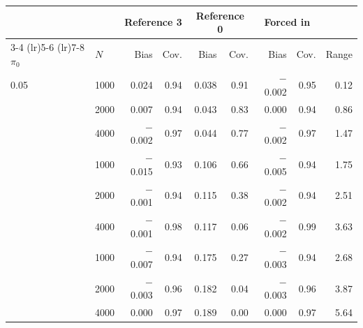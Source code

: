\begin{tabular}{ll rr rr rr r}
\toprule
 & & \multicolumn{2}{c}{Reference 3} & \multicolumn{2}{c}{Reference 0} & \multicolumn{2}{c}{Forced in} & \\
\cmidrule(lr){3-4} \cmidrule(lr){5-6} \cmidrule(lr){7-8}
$\pi_0$ & $N$ & Bias & Cov. & Bias & Cov. & Bias & Cov. & Range \\
\midrule
0.05 & 1000 & 0.024 & 0.94 & 0.038 & 0.91 & $-$0.002 & 0.95 & 0.12 \\
 & 2000 & 0.007 & 0.94 & 0.043 & 0.83 & 0.000 & 0.94 & 0.86 \\
 & 4000 & $-$0.002 & 0.97 & 0.044 & 0.77 & $-$0.002 & 0.97 & 1.47 \\
\addlinespace
0.15 & 1000 & $-$0.015 & 0.93 & 0.106 & 0.66 & $-$0.005 & 0.94 & 1.75 \\
 & 2000 & $-$0.001 & 0.94 & 0.115 & 0.38 & $-$0.002 & 0.94 & 2.51 \\
 & 4000 & $-$0.001 & 0.98 & 0.117 & 0.06 & $-$0.002 & 0.99 & 3.63 \\
\addlinespace
0.30 & 1000 & $-$0.007 & 0.94 & 0.175 & 0.27 & $-$0.003 & 0.94 & 2.68 \\
 & 2000 & $-$0.003 & 0.96 & 0.182 & 0.04 & $-$0.003 & 0.96 & 3.87 \\
 & 4000 & 0.000 & 0.97 & 0.189 & 0.00 & 0.000 & 0.97 & 5.64 \\
\bottomrule
\end{tabular}
